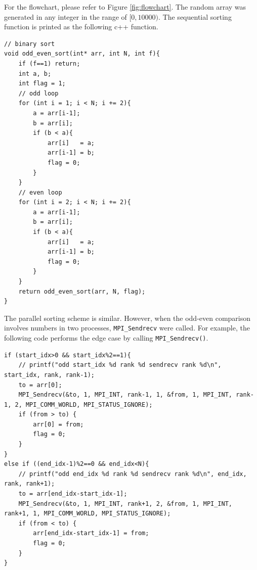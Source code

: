 \documentclass[twoside,12pt]{article}
\theoremstyle{definition}
\theoremstyle{remark}
\begin{document}
For the flowchart, please refer to Figure \ref{fig:flowchart}.
The random array was generated in any integer in the range
of $[0, 10000)$.
The sequential sorting function is printed as the following c++ function.
\begin{lstlisting}[style=cpp]
// binary sort
void odd_even_sort(int* arr, int N, int f){
    if (f==1) return;
    int a, b;
    int flag = 1;
    // odd loop
    for (int i = 1; i < N; i += 2){
        a = arr[i-1];
        b = arr[i];
        if (b < a){
            arr[i]   = a;
            arr[i-1] = b;
            flag = 0;
        }
    }
    // even loop
    for (int i = 2; i < N; i += 2){
        a = arr[i-1];
        b = arr[i];
        if (b < a){
            arr[i]   = a;
            arr[i-1] = b;
            flag = 0;
        }
    }
    return odd_even_sort(arr, N, flag);
}
\end{lstlisting}
The parallel sorting scheme is similar.
However, when the odd-even comparison involves numbers in two processes,
\lstinline|MPI_Sendrecv| were called.
For example, the following code performs the edge case by calling
\lstinline|MPI_Sendrecv()|.
\begin{lstlisting}[style=cpp]
if (start_idx>0 && start_idx%2==1){
    // printf("odd start_idx %d rank %d sendrecv rank %d\n", start_idx, rank, rank-1);
    to = arr[0];
    MPI_Sendrecv(&to, 1, MPI_INT, rank-1, 1, &from, 1, MPI_INT, rank-1, 2, MPI_COMM_WORLD, MPI_STATUS_IGNORE);
    if (from > to) {
        arr[0] = from;
        flag = 0;
    }
} 
else if ((end_idx-1)%2==0 && end_idx<N){
    // printf("odd end_idx %d rank %d sendrecv rank %d\n", end_idx, rank, rank+1);
    to = arr[end_idx-start_idx-1];
    MPI_Sendrecv(&to, 1, MPI_INT, rank+1, 2, &from, 1, MPI_INT, rank+1, 1, MPI_COMM_WORLD, MPI_STATUS_IGNORE);
    if (from < to) {
        arr[end_idx-start_idx-1] = from;
        flag = 0;
    }
}
\end{lstlisting}
\end{document}
